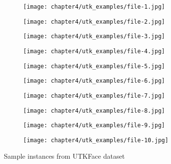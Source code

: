 \documentclass[../report.tex]{subfiles}
\begin{document}
	    \begin{figure}[H]
		\centering
		\begin{subfigure}[b]{0.17\textwidth}
			\centering
			\texttt{[image: chapter4/utk\_examples/file-1.jpg]}
		\end{subfigure}
		\begin{subfigure}[b]{0.17\textwidth}
			\centering
			\texttt{[image: chapter4/utk\_examples/file-2.jpg]}
		\end{subfigure}
		\begin{subfigure}[b]{0.17\textwidth}
			\centering
			\texttt{[image: chapter4/utk\_examples/file-3.jpg]}
		\end{subfigure}
		\begin{subfigure}[b]{0.17\textwidth}
		\centering
		\texttt{[image: chapter4/utk\_examples/file-4.jpg]}
		\end{subfigure}
		\begin{subfigure}[b]{0.17\textwidth}
			\centering
			\texttt{[image: chapter4/utk\_examples/file-5.jpg]}
		\end{subfigure}
		\begin{subfigure}[b]{0.17\textwidth}
			\centering
			\texttt{[image: chapter4/utk\_examples/file-6.jpg]}
		\end{subfigure}
		\begin{subfigure}[b]{0.17\textwidth}
			\centering
			\texttt{[image: chapter4/utk\_examples/file-7.jpg]}
		\end{subfigure}
		\begin{subfigure}[b]{0.17\textwidth}
			\centering
			\texttt{[image: chapter4/utk\_examples/file-8.jpg]}
		\end{subfigure}
		\begin{subfigure}[b]{0.17\textwidth}
		\centering
		\texttt{[image: chapter4/utk\_examples/file-9.jpg]}
		\end{subfigure}
		\begin{subfigure}[b]{0.17\textwidth}
		\centering
		\texttt{[image: chapter4/utk\_examples/file-10.jpg]}
		\end{subfigure}
		\caption{Sample instances from UTKFace dataset}
		\label{fig_utk_examples}
	\end{figure}
\end{document}
